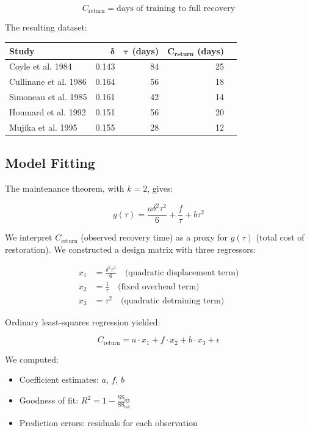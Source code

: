 \documentclass[12pt,a4paper]{article}
\begin{document}
\begin{equation}
C_{\text{return}} = \text{days of training to full recovery}
\end{equation}

The resulting dataset:

\begin{center}
\begin{tabular}{l r r r r}
\toprule
\textbf{Study} & $\boldsymbol{\delta}$ & $\boldsymbol{\tau}$ (days) & $\mathbf{C_{\text{return}}}$ (days) \\
\midrule
Coyle et al. 1984 & 0.143 & 84 & 25 \\
Cullinane et al. 1986 & 0.164 & 56 & 18 \\
Simoneau et al. 1985 & 0.161 & 42 & 14 \\
Houmard et al. 1992 & 0.151 & 56 & 20 \\
Mujika et al. 1995 & 0.155 & 28 & 12 \\
\bottomrule
\end{tabular}
\end{center}

\subsection{Model Fitting}

The maintenance theorem, with $k=2$, gives:

\begin{equation}
g(\tau) = \frac{a\delta^2\tau^2}{6} + \frac{f}{\tau} + b\tau^2
\end{equation}

We interpret $C_{\text{return}}$ (observed recovery time) as a proxy for $g(\tau)$ (total cost of restoration). We constructed a design matrix with three regressors:

\begin{align}
x_1 &= \frac{\delta^2\tau^2}{6} \quad \text{(quadratic displacement term)} \\
x_2 &= \frac{1}{\tau} \quad \text{(fixed overhead term)} \\
x_3 &= \tau^2 \quad \text{(quadratic detraining term)}
\end{align}

Ordinary least-squares regression yielded:

\begin{equation}
C_{\text{return}} = a \cdot x_1 + f \cdot x_2 + b \cdot x_3 + \epsilon
\end{equation}

We computed:
\begin{itemize}
\item Coefficient estimates: $a$, $f$, $b$
\item Goodness of fit: $R^2 = 1 - \frac{\text{SS}_{\text{res}}}{\text{SS}_{\text{tot}}}$
\item Prediction errors: residuals for each observation
\end{itemize}
\end{document}
